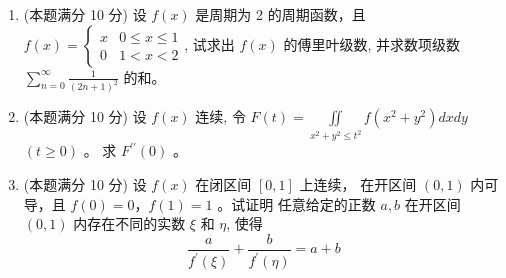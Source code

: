 \begin{enumerate}


\item 
(本题满分 10 分)
设 $f(x)$ 是周期为 2 的周期函数，且 $f(x)=\left\{\begin{array}{ll}x & 0 \leqslant x \leqslant 1 \\ 0 & 1<x<2\end{array}\right.$, 试求出 $f(x)$ 的傅里叶级数,
并求数项级数 $\sum\limits_{n=0}^{\infty} \frac{1}{(2 n+1)^{2}}$ 的和。




\item 
(本题满分 10 分)
设 $f(x)$ 连续, 令 $F(t)=\iint\limits_{x^{2}+y^{2} \leqslant t^{2}} f\left(x^{2}+y^{2}\right) d x d y$ $(t \geqslant 0)$ 。 求 $F^{\prime \prime}(0)$ 。



\item 
(本题满分 10 分)
设 $f(x)$ 在闭区间 $[0,1]$ 上连续， 在开区间 $(0,1)$ 内可导，且 $f(0)=0$，$ f(1)=1$ 。试证明 任意给定的正数 $a, b$ 在开区间 $(0,1)$ 内存在不同的实数 $\xi$ 和 $\eta$, 使得 
\[ 
\frac{a}{f^{\prime}(\xi)}+\frac{b}{f^{\prime}(\eta)}=a+b
 \]

	
	






	
\end{enumerate}


